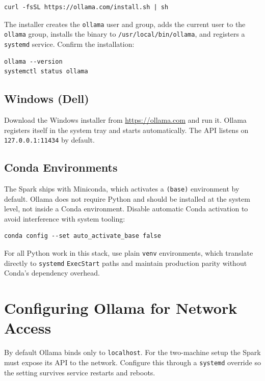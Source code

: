 \begin{lstlisting}[style=bashstyle, caption={Install Ollama on Ubuntu}]
curl -fsSL https://ollama.com/install.sh | sh
\end{lstlisting}

The installer creates the \texttt{ollama} user and group, adds the
current user to the \texttt{ollama} group, installs the binary to
\texttt{/usr/local/bin/ollama}, and registers a \texttt{systemd} service.
Confirm the installation:

\begin{lstlisting}[style=bashstyle]
ollama --version
systemctl status ollama
\end{lstlisting}

\subsection{Windows (Dell)}

Download the Windows installer from \url{https://ollama.com} and run it.
Ollama registers itself in the system tray and starts automatically. The
API listens on \texttt{127.0.0.1:11434} by default.

\subsection{Conda Environments}

The Spark ships with Miniconda, which activates a \texttt{(base)}
environment by default. Ollama does not require Python and should be
installed at the system level, not inside a Conda environment. Disable
automatic Conda activation to avoid interference with system tooling:

\begin{lstlisting}[style=bashstyle]
conda config --set auto_activate_base false
\end{lstlisting}

For all Python work in this stack, use plain \texttt{venv} environments,
which translate directly to \texttt{systemd} \texttt{ExecStart} paths
and maintain production parity without Conda's dependency overhead.

\section{Configuring Ollama for Network Access}
\label{sec:network-config}

By default Ollama binds only to \texttt{localhost}. For the two-machine
setup the Spark must expose its API to the network. Configure this
through a \texttt{systemd} override so the setting survives service
restarts and reboots.

